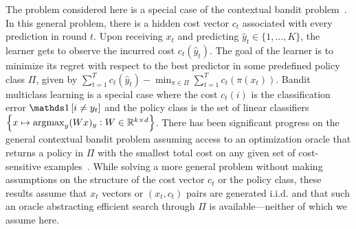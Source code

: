 
The problem considered here is a special case of the
contextual bandit problem~\citep{Auer-2003, Langford-Zhang-2008}. 
In this general problem, there is a hidden cost vector $c_t$ associated with every prediction in round $t$.  Upon receiving $x_t$ and predicting $\widehat{y}_t \in \{1,\ldots,K\}$, the learner gets to observe the incurred cost $c_t(\widehat{y}_t)$.  
The goal of the learner is to minimize its regret with respect to the best predictor in some predefined policy class $\Pi$, given by $\sum_{t=1}^T c_t(\widehat{y}_t) -
\min_{\pi \in \Pi} \sum_{t=1}^T c_t(\pi(x_t))$.
Bandit multiclass learning is a special case
where the cost $c_t(i)$ is the classification error $\indicator{i \neq y_t}$ and 
the policy class is the set of linear classifiers $\cbr{x \mapsto \argmax_y (Wx)_y: W \in \R^{k \times d}}$.
There has been significant progress on the general contextual bandit problem
assuming access to an optimization oracle that returns a policy in $\Pi$ with the smallest total cost on any given set of cost-sensitive examples~\citep{Dudik-Hsu-Kale-Karampatziakis-Langford-Reyzin-Zhang-2011,
Agarwal-Hsu-Kale-Langford-Li-Schapire-2014, Rakhlin-Sridharan-2016,
Syrgkanis-Krishnamurthy-Schapire-2016,
Syrgkanis-Luo-Krishnamurthy-Schapire-2016}.
While solving a more general problem without making assumptions on the structure of the cost vector $c_t$ or the policy class, these results assume that $x_t$ vectors or $(x_t,c_t)$ pairs are generated i.i.d. and that such an oracle abstracting efficient search through $\Pi$ is available---neither of which we assume here.



